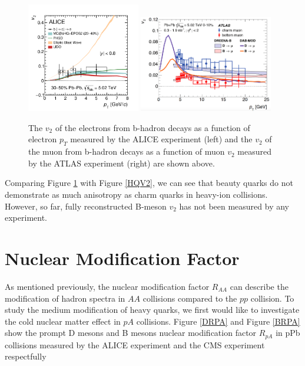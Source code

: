 \begin{figure}[hbtp]
\begin{center}
\includegraphics[width=0.44\textwidth]{Figures/Chapter2/ALICENPEv2.png}
\includegraphics[width=0.52\textwidth]{Figures/Chapter2/ATLASNPMUv2.png}
\caption{The $v_2$ of the electrons from b-hadron decays as a function of electron $p_T$ measured by the ALICE experiment (left) and the $v_2$ of the muon from b-hadron decays as a function of muon $v_2$ measured by the ATLAS experiment (right) are shown above.}
\label{BeautyEV2}
\end{center}
\end{figure}   


Comparing Figure \ref{BeautyEV2} with Figure \ref{HQV2}, we can see that beauty quarks do not demonstrate as much anisotropy as charm quarks in heavy-ion collisions. However, so far, fully reconstructed B-meson $v_2$ has not been measured by any experiment. 



\section{Nuclear Modification Factor}

As mentioned previously, the nuclear modification factor $R_{AA}$ can describe the modification of hadron spectra in $AA$ collisions compared to the $pp$ collision. To study the medium modification of heavy quarks, we first would like to investigate the cold nuclear matter effect in $pA$ collisions. Figure \ref{DRPA} and Figure \ref{BRPA} show the prompt D mesons and B mesons nuclear modification factor $R_{pA}$ in pPb collisions measured by the ALICE experiment \cite{ALICEDRPARef} and the CMS experiment \cite{CMSBRPARef} respectfully 




